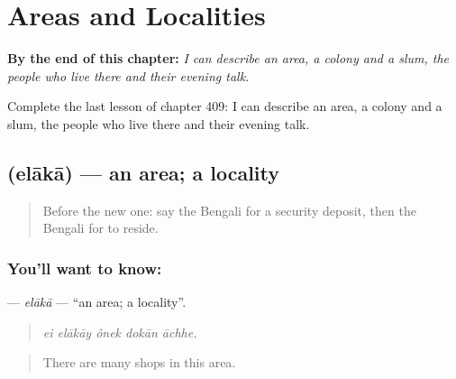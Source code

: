 
\chapter{Areas and Localities}
\label{ch:bn-areas-and-localities}

\begin{chapteropening}
\textbf{By the end of this chapter:} \emph{I can describe an area, a colony and a slum, the people who live there and their evening talk.}

Complete the last lesson of chapter 409: I can describe an area, a colony and a slum, the people who live there and their evening talk.
\end{chapteropening}

\section[\texorpdfstring{\bn{এলাকা} (elākā)}{এলাকা (elākā)}]{ (elākā) — an area; a locality}

\label{lesson:BN-C409-elaka}



\begin{quote}
Before the new one: say the Bengali for a security deposit, then the Bengali for to reside.
\end{quote}

\subsection*{You'll want to know: }
\textbf{} — \emph{elākā} — \textquotedblleft{}an area; a locality\textquotedblright{}.

\begin{quote}
    
\end{quote}

\begin{quote}
\emph{ei elākāy ônek dokān āchhe.}
\end{quote}

\begin{quote}
There are many shops in this area.
\end{quote}

